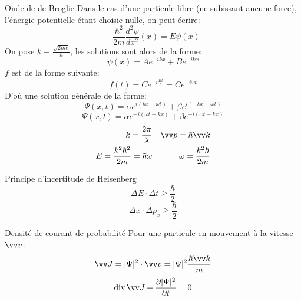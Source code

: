 \documentclass[french, a4paper, 11pt, twocolumn]{article}
\DeclareMathOperator{\diverg}{div}        %
\begin{document}
\begin{cadre}{Onde de de Broglie}
  Dans le cas d'une particule libre (ne subissant aucune force), l'énergie potentielle étant choisie nulle, on peut écrire:
  \[-\dfrac{\hbar^{2}}{2m}\dfrac{d^{2}\psi}{dx^{2}}(x)=E\psi(x)\]
  On pose \(k=\frac{\sqrt{2me}}{\hbar}\), les solutions sont alors de la forme:
  \[\psi(x) = Ae^{-ikx} + Be^{-ikx}\]
  \(f\) est de la forme suivante:
  \[f(t) = Ce^{-i\frac{Et}{\hbar}}=Ce^{-i\omega t}\]
  D'où une solution générale de la forme:
  \[\Psi(x,t) = \alpha e^{i(kx-\omega t)} + \beta e^{i(-kx -\omega t)}\]
  \[\Psi(x,t) = \alpha e^{-i(\omega t - kx)} + \beta e^{-i(\omega t + kx)}\]
  \tcblower
  \begin{align*}
    k = \dfrac{2\pi}{\lambda} && \vv p = \hbar\vv k \\
    E = \dfrac{k^{2}\hbar^{2}}{2m} = \hbar\omega && \omega = \dfrac{k^{2}\hbar}{2m}
  \end{align*}
\end{cadre}

\begin{cadre}{Principe d'incertitude de Heisenberg}
  \[\Delta E \cdot \Delta t    \geqslant \dfrac{\hbar}{2}\]
  \[\Delta x \cdot \Delta p_{x} \geqslant \dfrac{\hbar}{2}\]
\end{cadre}

\begin{cadre}{Densité de courant de probabilité}
  Pour une particule en mouvement à la vitesse \(\vv v\):
  \[\vv J = \lvert\Psi\rvert^2\cdot \vv v = \lvert\Psi\rvert^2\dfrac{\hbar\vv k}{m}\]
  \tcblower
  \[\diverg \vv J + \dfrac{\partial\lvert\Psi\rvert^2}{\partial t} = 0\]
\end{cadre}
\end{document}

